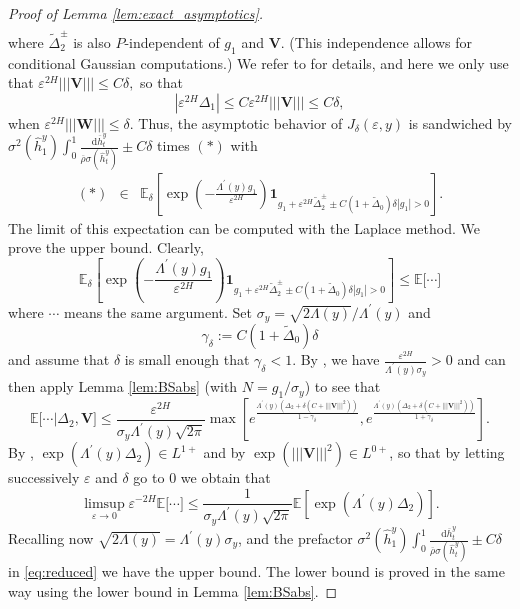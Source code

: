 \documentclass[11pt]{article}
\theoremstyle{plain}
\theoremstyle{definition}
\theoremstyle{remark}
\renewcommand{\bar}{\overline}
\renewcommand{\tilde}{\widetilde}
\renewcommand{\hat}{\widehat}
\newcommand{\dd}{\mathrm{d}}
\newcommand{\bE}{\mathbb{E}}
\newcommand{\1}{\mathbf{1}}
\numberwithin{equation}{section}
\def\eps{\varepsilon}
\def\WW{\mathbf W}
\def\VV{\mathbf V}
\begin{document}
\begin{proof}[Proof of Lemma \ref{lem:exact_asymptotics}]
\[\begin{split}
\end{split}\]
where $\tilde \Delta _{2}^\pm$ is also $P$-independent of $g_1$  and $\VV$. (This independence allows for conditional Gaussian computations.) We refer to \cite{friz2018precise1} for details, and here we only use that
$\eps^{2H} ||| \VV ||| \leq C \delta,$
so that
$$|\eps^{2H} \Delta_1| \leq C \eps^{2H} ||| \VV |||
 \leq C \delta, $$
when $\eps^{2H} |||\WW|||\leq \delta$. Thus, the asymptotic behavior of $J_\delta (\eps, y)$ is sandwiched by $
\sigma^2 (\hat{h}_1^y)
\int_0^1\frac{\dd \bar{h}_t^y}{\bar{\rho} \sigma(\hat{h}_t^y) }  \pm C\delta$ times $(*)$ with 
\begin{eqnarray*}
      (*)   & \in & \bE_\delta \left[ \exp \left( {  - \frac{\Lambda^{\prime}(y)g_1 }{\eps^{2H}}  } \right) \1_{  g_1+ \eps^{2H}  \tilde \Delta^\pm_{2} \pm C (1+ \tilde \Delta _{0} ) \delta |g_1| >0}
\right] .
\end{eqnarray*}
The limit of this expectation can be computed with the Laplace method. 
We prove the upper bound. Clearly,
$$
      \bE_\delta \left[ \exp \left( {  - \frac{\Lambda^{\prime}(y)g_1 }{\eps^{2H}}  } \right)
      \1_{  g_1+ \eps^{2H}  \tilde \Delta^\pm_{2} \pm C (1+ \tilde \Delta _{0} ) \delta |g_1| >0}
\right] \le \bE \big[ \cdots \big] 
$$
where $\cdots$ means the same argument. Set $\sigma_y=\sqrt{2\Lambda(y)}/\Lambda^{\prime}(y)$ and
$$
\gamma_\delta:= C(1+\tilde \Delta_0) \delta
$$
and assume that $\delta$ is small enough that $\gamma_\delta < 1$. By \cite[Theorem 6.1, part (iii)]{friz2018precise1}, 
we have $\frac{\eps^{2H}}{\Lambda^{\prime}(y) \sigma_y}>0$ and can then apply Lemma \ref{lem:BSabs} (with $N= g_1 / \sigma_y$) to see that 
$$
\bE \big[ \cdots  |\Delta_2, \mathbf{V} \big]  \leq 
\frac{\eps^{2H}}{\sigma_y \Lambda^{\prime}(y)\sqrt{2\pi} } \max\left[  e^{\frac{\Lambda^{\prime }\left( y\right)\left(\Delta_{2}+ \delta \left(C+||| \VV |||^2\right)\right)}{1-\gamma_{\delta}}}  , e^{\frac{\Lambda^{\prime }\left( y\right)\left(\Delta_{2}+ \delta \left(C+||| \VV |||^2\right)\right)}{1+\gamma_{\delta}}}\right].
$$
By \cite[Proposition 8.6 and proof of Corollary 7.1]{friz2018precise1}, $\exp\left(\Lambda^{\prime}\left( y\right)\Delta_{2}\right) \in L^{1+}$ and by \cite[Lemma 8.3 (iv)]{friz2018precise1} $\exp(||| \VV |||^2) \in L^{0+}$, so that by letting successively $\eps$ and $\delta$ go to $0$ we obtain that
\begin{equation*}
\limsup_{\varepsilon \to 0} \eps^{-2H} \bE \big[ \cdots \big]  \leq 
{ \frac{1}{\sigma_y \Lambda^{\prime}(y)\sqrt{2\pi} } }
\bE \left[ \exp\left(\Lambda^{\prime}\left( y\right)\Delta_{2}\right) \right].
 \end{equation*} 
Recalling now 
$\sqrt{2 \Lambda(y)}=\Lambda^{\prime}(y) \sigma_y$,
and the prefactor $\sigma^2 (\hat{h}_1^y) \int_0^1\frac{\dd \bar{h}_t^y}{\bar{\rho} \sigma(\hat{h}_t^y) }  \pm C\delta$ in \eqref{eq:reduced} we have the upper bound. 
The lower bound is proved in the same way using the lower bound in Lemma \ref{lem:BSabs}. 
\end{proof}
\end{document}
